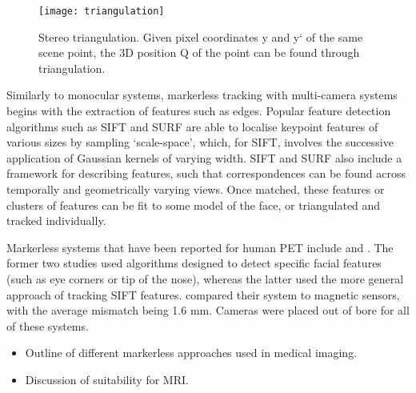 \documentclass[class=article, crop=false]{standalone}
\begin{document}
\begin{figure}
	\centering
	\texttt{[image: triangulation]}
	\caption{Stereo triangulation. Given pixel coordinates y and y` of the same scene point, the 3D position Q of the point can be found through triangulation.}
	\label{triangulation}
\end{figure}

\par 
Similarly to monocular systems, markerless tracking with multi-camera systems begins with the extraction of features such as edges. Popular feature detection algorithms such as SIFT \parencite{Lowe2004} and SURF \parencite{Bay2008} are able to localise keypoint features of various sizes by sampling `scale-space', which, for SIFT, involves the successive application of Gaussian kernels of varying width. SIFT and SURF  also include a framework for describing features, such that correspondences can be found across temporally and geometrically varying views. Once matched, these features or clusters of features can be fit to some model of the face, or triangulated and tracked individually.
\par 
Markerless systems that have been reported for human PET include \cite{Anishchenko2015,Gao2007} and \cite{Ma2008}. The former two studies used algorithms designed to detect specific facial features (such as eye corners or tip of the nose), whereas the latter used the more general approach of tracking SIFT features. \cite{Anishchenko2015} compared their system to magnetic sensors, with the average mismatch being 1.6 mm. Cameras were placed out of bore for all of these systems.
\par


\begin{itemize}
	\item Outline of different markerless approaches used in medical imaging.
	\item Discussion of suitability for MRI.
\end{itemize}
\end{document}
